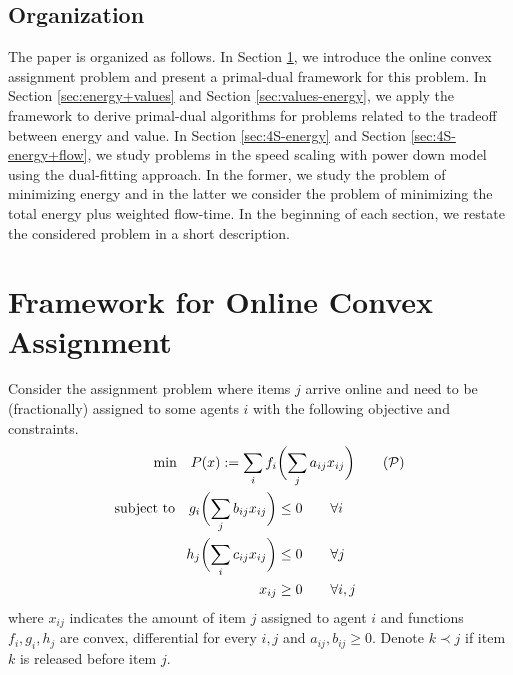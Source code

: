 \documentclass[11pt]{article}
\begin{document}
 
 
\subsection{Organization}
The paper is organized as follows. In Section \ref{sec:framework}, we introduce the 
online convex assignment problem and present a primal-dual framework for this problem.
In Section \ref{sec:energy+values} and Section \ref{sec:values-energy}, we apply the framework
to derive primal-dual algorithms for problems related to the tradeoff between energy and value. 
In Section \ref{sec:4S-energy} and Section \ref{sec:4S-energy+flow}, we study problems
in the speed scaling with power down model using the dual-fitting approach.  
In the former, we study the problem of minimizing energy and 
in the latter we consider the problem of minimizing 
the total energy plus weighted flow-time. In the beginning of each section, we 
restate the considered problem in a short description. 


\section{Framework for Online Convex Assignment}		\label{sec:framework}
  
Consider the assignment problem where items $j$ arrive online 
and need to be (fractionally) assigned to some agents $i$ with the following objective and constraints.   
\begin{alignat}{3}	\label{prog:primal}
    \text{min} \quad P(x) :=  \sum_{i} f_{i}  &\biggl( \sum_{j} a_{ij}x_{ij} \biggl)  \tag{$\mathcal{P}$} \\
\text{subject to} \quad   g_{i}\biggl(\sum_{j} b_{ij} x_{ij}\biggl) &\leq 0  \qquad \forall i	\notag \\
					     h_{j}\biggl(\sum_{i} c_{ij} x_{ij}\biggl) &\leq 0 \qquad \forall j 	\notag \\ 
	    				     x_{ij} &\geq 0 \qquad \forall i,j	\notag 
  \end{alignat}
where $x_{ij}$ indicates the amount of item $j$ assigned to agent $i$ 
and functions $f_{i},g_{i},h_{j}$ are convex, differential for every $i,j$ and 
$a_{ij}, b_{ij} \geq 0$. Denote $k \prec j$ if item $k$ is released before item $j$. 
\end{document}
